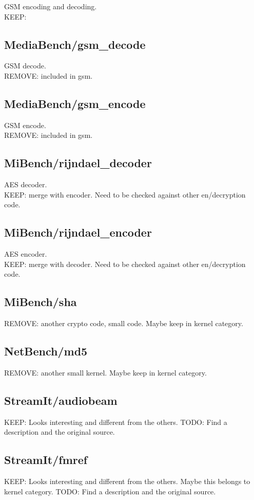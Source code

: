 \documentclass[a4paper]{article}
\begin{document}
GSM encoding and decoding. \\
KEEP:
\subsection{MediaBench/gsm\_decode}

GSM decode. \\
REMOVE: included in gsm.

\subsection{MediaBench/gsm\_encode}

GSM encode. \\
REMOVE: included in gsm.

\subsection{MiBench/rijndael\_decoder}

AES decoder. \\
KEEP: merge with encoder. Need to be checked against other en/decryption code.

\subsection{MiBench/rijndael\_encoder}

AES encoder. \\
KEEP: merge with decoder. Need to be checked against other en/decryption code.

\subsection{MiBench/sha}

REMOVE: another crypto code, small code. Maybe keep in kernel category.

\subsection{NetBench/md5}

REMOVE: another small kernel. Maybe keep in kernel category.

\subsection{StreamIt/audiobeam}

KEEP: Looks interesting and different from the others.
TODO: Find a description and the original source.

\subsection{StreamIt/fmref}

KEEP: Looks interesting and different from the others. Maybe this belongs to kernel category.
TODO: Find a description and the original source.
\end{document}
